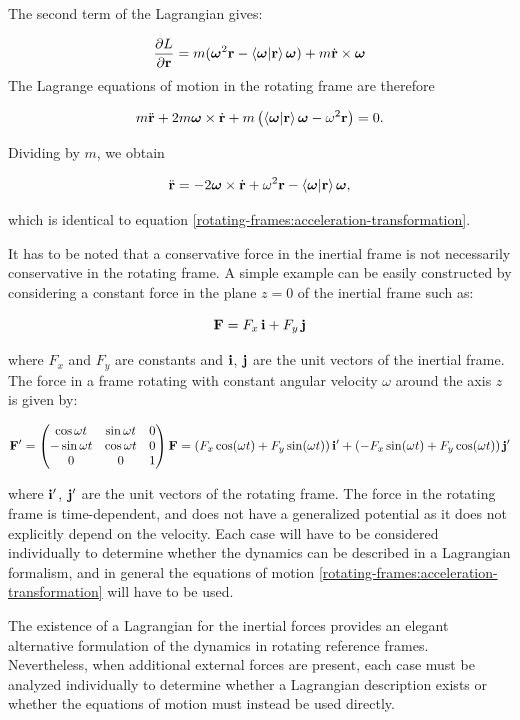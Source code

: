 \documentclass[12pt]{article}
\begin{document}
The second term of the Lagrangian gives:

\[
  \frac{\partial L}{\partial\vb{r}} = m (\boldsymbol{\omega}^2 {\vb r} -\ip{\boldsymbol{\omega}}{\vb r}\boldsymbol{\omega} ) +
  m\dot{\vb{r}}\times \boldsymbol{\omega}
\]
The Lagrange equations of motion in the rotating frame are therefore

\[
  m\ddot{\vb r}
  + 2m\boldsymbol{\omega}\times\dot{\vb r}
  + m\left(
    \ip{\boldsymbol{\omega}}{\vb r}\boldsymbol{\omega}
    - \omega^2\vb r
  \right)
  = 0.
\]

Dividing by $m$, we obtain

\[
  \ddot{\vb r}
  =
  -2\boldsymbol{\omega}\times\dot{\vb r}
  + \omega^2\vb r
  - \ip{\boldsymbol{\omega}}{\vb r}\boldsymbol{\omega},
\]

which is identical to equation
\eqref{rotating-frames:acceleration-transformation}.
\par

It has to be noted that a conservative force in the inertial frame is not necessarily
conservative in the rotating frame. A simple example can be easily constructed by considering
a constant force in the plane $z=0$ of the inertial frame such as:

\[
  \vb{F} = F_x\,\vb{i} + F_y\,\vb{j}
\]

where $F_x$ and $F_y$ are constants and $\vb{i}$, $\vb{j}$ are the unit vectors of the
inertial frame. The force in a frame rotating with constant angular velocity $\omega$ around
the axis $z$ is given by:

\[
  \vb{F}' =
  \begin{pmatrix}
    \cos\omega t  & \sin\omega t & 0 \\
    -\sin\omega t & \cos\omega t & 0 \\
    0             & 0            & 1
  \end{pmatrix}
  \vb{F}
  = (F_x\cos(\omega t) + F_y\sin(\omega t))\,\vb{i}'
  + (-F_x\sin(\omega t) + F_y\cos(\omega t))\,\vb{j}'
\]

where $\vb{i}'$, $\vb{j}'$ are the unit vectors of the rotating frame. The force in the
rotating frame is time-dependent, and does not have a generalized potential as it does not
explicitly depend on the velocity. Each case will have to be considered individually to
determine whether the dynamics can be described in a Lagrangian formalism, and in general the
equations of motion \eqref{rotating-frames:acceleration-transformation} will have to be used.

The existence of a Lagrangian for the inertial forces provides an elegant alternative formulation
of the dynamics in rotating reference frames. Nevertheless, when additional external forces are present,
each case must be analyzed individually to determine whether a Lagrangian description exists
or whether the equations of motion must instead be used directly.
\end{document}
